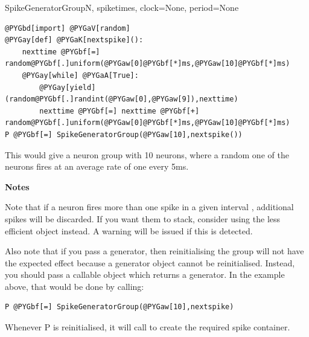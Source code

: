 \documentclass[letterpaper,10pt,english]{manual}
\begin{document}
\begin{classdesc}{SpikeGeneratorGroup}{N, spiketimes, clock=None, period=None}
\begin{Verbatim}[commandchars=@\[\]]
@PYGbd[import] @PYGaV[random]
@PYGay[def] @PYGaK[nextspike]():
    nexttime @PYGbf[=] random@PYGbf[.]uniform(@PYGaw[0]@PYGbf[*]ms,@PYGaw[10]@PYGbf[*]ms)
    @PYGay[while] @PYGaA[True]:
        @PYGay[yield] (random@PYGbf[.]randint(@PYGaw[0],@PYGaw[9]),nexttime)
        nexttime @PYGbf[=] nexttime @PYGbf[+] random@PYGbf[.]uniform(@PYGaw[0]@PYGbf[*]ms,@PYGaw[10]@PYGbf[*]ms)
P @PYGbf[=] SpikeGeneratorGroup(@PYGaw[10],nextspike())
\end{Verbatim}

This would give a neuron group  with 10 neurons, where a random one
of the neurons fires at an average rate of one every 5ms.

\textbf{Notes}

Note that if a neuron fires more than one spike in a given interval , additional
spikes will be discarded. If you want them to stack, consider using the less efficient
\hyperlink{brian.MultipleSpikeGeneratorGroup}{} object instead. A warning will be issued if this
is detected.

Also note that if you pass a generator, then reinitialising the group will not have the
expected effect because a generator object cannot be reinitialised. Instead, you should
pass a callable object which returns a generator. In the example above, that would be
done by calling:

\begin{Verbatim}[commandchars=@\[\]]
P @PYGbf[=] SpikeGeneratorGroup(@PYGaw[10],nextspike)
\end{Verbatim}

Whenever P is reinitialised, it will call  to create the required spike
container.
\end{classdesc}
\end{document}
